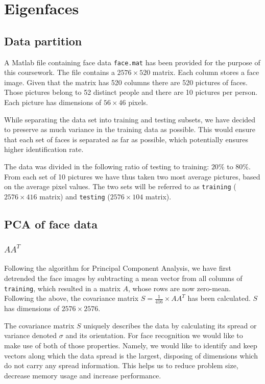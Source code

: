 \documentclass[10pt,twocolumn,letterpaper]{article}
\begin{document}
\section{Eigenfaces}

\subsection{Data partition}

A Matlab file containing face data {\tt\small face.mat} has been provided for the purpose of this coursework. The file contains a $2576 \times 520$ matrix. Each column stores a face image. Given that the matrix has 520 columns there are 520 pictures of faces. Those pictures belong to 52 distinct people and there are 10 pictures per person. Each picture has dimensions of $56 \times 46$ pixels.

While separating the data set into training and testing subsets, we have decided to preserve as much variance in the training data as possible. This would ensure that each set of faces is separated as far as possible, which potentially ensures higher identification rate.

The data was divided in the following ratio of testing to training: $20\%$ to $80\%$. From each set of 10 pictures we have thus taken two most average pictures, based on the average pixel values. The two sets will be referred to as {\tt\small training} ($2576 \times 416$ matrix) and {\tt\small testing} ($2576 \times 104$ matrix).

\subsection{PCA of face data}
\subsubsection{\boldmath$AA^T$} \label{sec:aat}
Following the algorithm for Principal Component Analysis, we have first detrended the face images by subtracting a mean vector from all columns of {\tt\small training}, which resulted in a matrix $A$, whose rows are now zero-mean. Following the above, the covariance matrix $S=\frac{1}{416} \times AA^T$ has been calculated. $S$ has dimensions of $2576 \times 2576$.

The covariance matrix $S$ uniquely describes the data by calculating its spread or variance denoted $\sigma$ and its orientation. For face recognition we would like to make use of both of those properties. Namely, we would like to identify and keep vectors along which the data spread is the largest, disposing of dimensions which do not carry any spread information. This helps us to reduce problem size, decrease memory usage and increase performance. 
\end{document}
